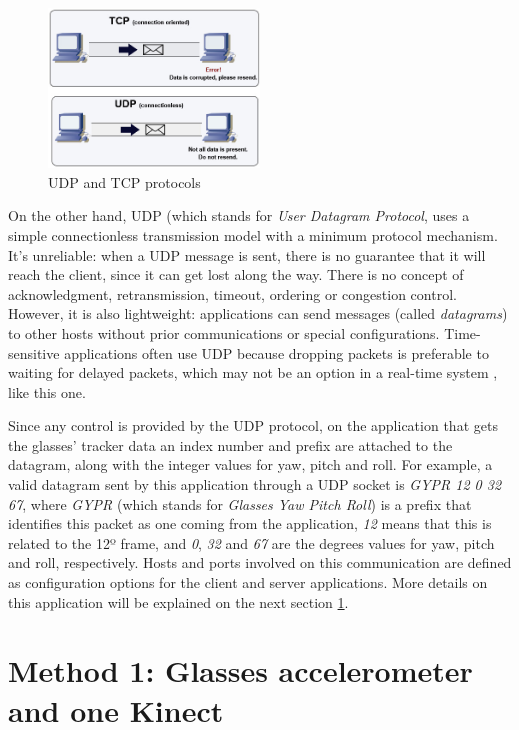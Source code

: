 \documentclass[msc, a4paper, classic, en]{ufbathesis}
\begin{document}
\begin{figure}
\centering
\includegraphics[width=0.5\textwidth]{images/udptcp.png}
\caption{UDP and TCP protocols \cite{udpimg}}
\label{fig:udptcp}
\end{figure}

On the other hand, UDP (which stands for \textit{User Datagram Protocol}, uses a simple connectionless transmission model with a minimum protocol mechanism. It's unreliable: when a UDP message is sent, there is no guarantee that it will reach the client, since it can get lost along the way. There is no concept of acknowledgment, retransmission, timeout, ordering or congestion control. However, it is also lightweight: applications can send messages (called \textit{datagrams}) to other hosts without prior communications or special configurations. Time-sensitive applications often use UDP because dropping packets is preferable to waiting for delayed packets, which may not be an option in a real-time system \cite{udp}, like this one.

Since any control is provided by the UDP protocol, on the application that gets the glasses' tracker data an index number and prefix are attached to the datagram, along with the integer values for yaw, pitch and roll. For example, a valid datagram sent by this application through a UDP socket is \textit{GYPR 12 0 32 67}, where \textit{GYPR} (which stands for \textit{Glasses Yaw Pitch Roll}) is a prefix that identifies this packet as one coming from the application, \textit{12} means that this is related to the 12º frame, and \textit{0}, \textit{32} and \textit{67} are the degrees values for yaw, pitch and roll, respectively. Hosts and ports involved on this communication are defined as configuration options for the client and server applications. More details on this application will be explained on the next section \ref{sec:method1}.

\section{Method 1: Glasses accelerometer and one Kinect}
\label{sec:method1}
\end{document}

